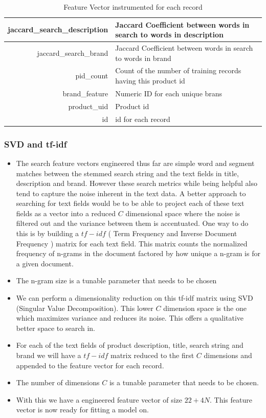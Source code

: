 \documentclass[twoside,12pt]{article}
\begin{document}
\begin{itemize}
\begin{table}[h]
{\begin{tabular}{|r|l|}
			\hline
			jaccard\_search\_description & Jaccard Coefficient between words in search to words in description\\
			\hline
			jaccard\_search\_brand & Jaccard Coefficient between words in search to words in brand\\
			\hline
			pid\_count & Count of the number of training records having this product id\\
			\hline
			brand\_feature & Numeric ID for each unique brans\\
			\hline
			product\_uid & Product id \\
			\hline
			id & id for each record \\
			\hline
		\end{tabular}
	}
	\caption[]{Feature Vector instrumented for each record}
	\label{p_tab_ef}
\end{table}
\end{itemize}

\FloatBarrier
\subsubsection{SVD and tf-idf}
\label{svd_tfidf}
\begin{itemize}
\item
The search feature vectors engineered thus far are simple word and segment matches between the stemmed search string and the text fields in title, description and brand. However these search metrics while being helpful also tend to capture the noise inherent in the text data. A better approach to searching for text fields would be to be able to project each of these text fields as a vector into a reduced $C$ dimensional space where the noise is filtered out and the variance between them is accentuated. One way to do this is by building a $tf-idf$ ( Term Frequency and Inverse Document Frequency ) matrix for each text field. This matrix counts the normalized frequency of n-grams in the document factored by how unique a n-gram is for a given document. 
\item
The n-gram size is a tunable parameter that needs to be chosen
\item
We can perform a dimensionality reduction on this tf-idf matrix using SVD (Singular Value Decomposition). This lower $C$ dimension space is the one which maximizes variance and reduces its noise. This offers a qualitative better space to search in.
\item
For each of the text fields of product description, title, search string and brand we will have a $tf-idf$ matrix reduced to the first $C$ dimensions and appended to the feature vector for each record.
\item
The number of dimensions $C$ is a tunable parameter that needs to be chosen.
\item
With this we have a engineered feature vector of size $22+4N$. This feature vector is now ready for fitting a model on.
\end{itemize}
\end{document}
